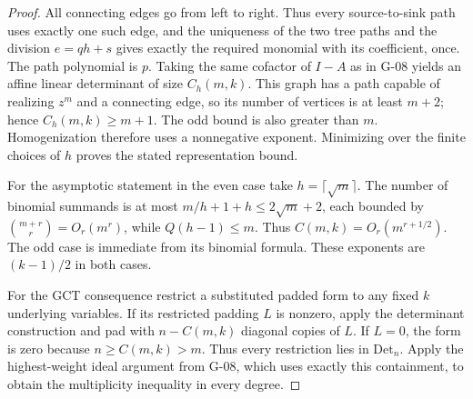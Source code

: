 \documentclass[11pt,a4paper]{article}
\theoremstyle{definition}\newtheorem{definition}{Definition}
\begin{document}
\begin{proof}
All connecting edges go from left to right. Thus every source-to-sink path uses exactly one such edge, and the uniqueness of the two tree paths and the division $e=qh+s$ gives exactly the required monomial with its coefficient, once. The path polynomial is $p$. Taking the same cofactor of $I-A$ as in G-08 yields an affine linear determinant of size $C_h(m,k)$. This graph has a path capable of realizing $z^m$ and a connecting edge, so its number of vertices is at least $m+2$; hence $C_h(m,k)\geq m+1$. The odd bound is also greater than $m$. Homogenization therefore uses a nonnegative exponent. Minimizing over the finite choices of $h$ proves the stated representation bound.

For the asymptotic statement in the even case take $h=\lceil\sqrt m\rceil$. The number of binomial summands is at most $m/h+1+h\leq2\sqrt m+2$, each bounded by $\binom{m+r}{r}=O_r(m^r)$, while $Q(h-1)\leq m$. Thus $C(m,k)=O_r(m^{r+1/2})$. The odd case is immediate from its binomial formula. These exponents are $(k-1)/2$ in both cases.

For the GCT consequence restrict a substituted padded form to any fixed $k$ underlying variables. If its restricted padding $L$ is nonzero, apply the determinant construction and pad with $n-C(m,k)$ diagonal copies of $L$. If $L=0$, the form is zero because $n\geq C(m,k)>m$. Thus every restriction lies in $\mathrm{Det}_n$. Apply the highest-weight ideal argument from G-08, which uses exactly this containment, to obtain the multiplicity inequality in every degree.
\end{proof}
\end{document}
